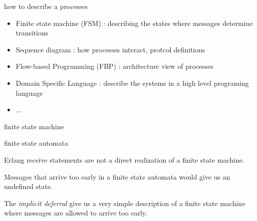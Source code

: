 \begin{frame}{how to describe a processes}

  \begin{itemize}
  \item Finite state machine (FSM) : describing the states where messages determine transitions \pause 
  \item Sequence diagram : how processes interact, protcol definitions \pause
  \item Flow-based Programming (FBP) : architecture view of processes
  \item Domain Specific Language : describe the systems in a high level programing language \pause
  \item  ... 
  \end{itemize}
  
\end{frame}



\begin{frame}{finite state machine}




\end{frame}


\begin{frame}{finite state automata}

Erlang receive statements are not a direct realization of a finite state machine.

\pause\vspace{10pt}

Messages that arrive too early in a finite state automata would give us an undefined state.

\pause\vspace{10pt}

The {\em implicit deferral} give us a very simple description of a
finite state machine where  messages are allowed to arrive too
early.


\end{frame}


